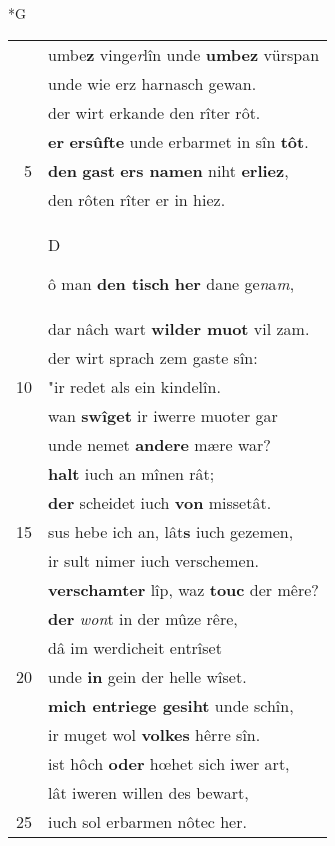 \documentclass[8pt,a4paper,notitlepage]{article}
\begin{document}
\newpage
\begin{table}[ht]
\begin{minipage}[t]{0.5\linewidth}
\small
\begin{center}*G
\end{center}
\begin{tabular}{rl}
 & umbe\textbf{z} vinge\textit{r}lîn unde \textbf{umbe}\textbf{z} vürspan\\ 
 & unde wie erz harnasch gewan.\\ 
 & der wirt erkande den rîter rôt.\\ 
 & \textbf{er} \textbf{ersûfte} unde erbarmet in sîn \textbf{tôt}.\\ 
5 & \textbf{den} \textbf{gast} \textbf{ers namen} niht \textbf{erliez},\\ 
 & den rôten rîter er in hiez.\\ 
 & \begin{large}D\end{large}ô man \textbf{den tisch} \textbf{her} dane ge\textit{n}a\textit{m},\\ 
 & dar nâch wart \textbf{wilder muot} vil zam.\\ 
 & der wirt sprach zem gaste sîn:\\ 
10 & "ir redet als ein kindelîn.\\ 
 & wan \textbf{swîget} ir iwerre muoter gar\\ 
 & unde nemet \textbf{andere} mære war?\\ 
 & \textbf{halt} iuch an mînen rât;\\ 
 & \textbf{der} scheidet iuch \textbf{von} missetât.\\ 
15 & sus hebe ich an, lât\textbf{s} iuch gezemen,\\ 
 & ir sult nimer iuch verschemen.\\ 
 & \textbf{verschamter} lîp, waz \textbf{touc} der mêre?\\ 
 & \textbf{der} \textit{won}t in der mûze rêre,\\ 
 & dâ im werdicheit entrîset\\ 
20 & unde \textbf{in} gein der helle wîset.\\ 
 & \textbf{mich entriege gesiht} unde schîn,\\ 
 & ir muget wol \textbf{volkes} hêrre sîn.\\ 
 & ist hôch \textbf{oder} hœhet sich iwer art,\\ 
 & lât iweren willen des bewart,\\ 
25 & iuch sol erbarmen nôtec her.\\ 

\end{tabular}
\end{minipage}
\end{table}
\end{document}

